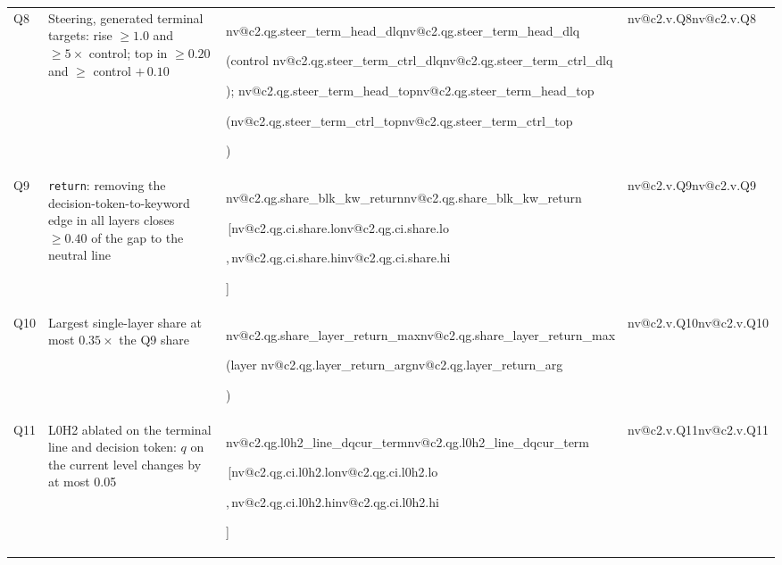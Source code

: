 \documentclass[11pt]{article}
\makeatletter
\newcommand{\nv}[1]{\ifcsname nv@#1\endcsname\csname nv@#1\endcsname\else\PackageError{numbers}{Unknown number key #1}{}\fi}
\newcommand{\ci}[2]{\,[#1,\,#2]}
\newcommand{\hd}[2]{L#1H#2}
\newcommand{\code}[1]{\texttt{#1}}
\makeatother
\begin{document}
\begin{table}[t]
\begin{tabularx}{\linewidth}{@{}lYYl@{}}
Q8 & Steering, generated terminal targets: rise $\geq 1.0$ and $\geq 5\times$ control; top in $\geq 0.20$ and $\geq$ control $+\,0.10$ & \nv{c2.qg.steer_term_head_dlq} (control \nv{c2.qg.steer_term_ctrl_dlq}); \nv{c2.qg.steer_term_head_top} (\nv{c2.qg.steer_term_ctrl_top}) & \nv{c2.v.Q8} \\
Q9 & \code{return}: removing the decision-token-to-keyword edge in all layers closes $\geq 0.40$ of the gap to the neutral line & \nv{c2.qg.share_blk_kw_return}\ci{\nv{c2.qg.ci.share.lo}}{\nv{c2.qg.ci.share.hi}} & \nv{c2.v.Q9} \\
Q10 & Largest single-layer share at most $0.35\times$ the Q9 share & \nv{c2.qg.share_layer_return_max} (layer \nv{c2.qg.layer_return_arg}) & \nv{c2.v.Q10} \\
Q11 & \hd{0}{2} ablated on the terminal line and decision token: $q$ on the current level changes by at most 0.05 & \nv{c2.qg.l0h2_line_dqcur_term}\ci{\nv{c2.qg.ci.l0h2.lo}}{\nv{c2.qg.ci.l0h2.hi}} & \nv{c2.v.Q11} \\
\bottomrule
\end{tabularx}
\end{table}
\end{document}
